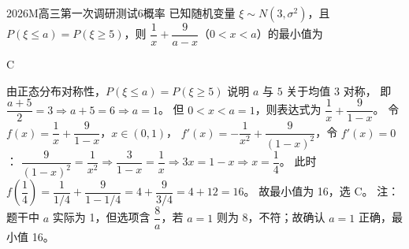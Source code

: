 
\begin{problem}{2026}{M}{高三第一次调研测试}{6}{概率}
已知随机变量 $\xi\sim N(3,\sigma^2)$，且 $P(\xi\leq a)=P(\xi\geq5)$，则 $\dfrac{1}{x}+\dfrac{9}{a-x}$（$0<x<a$）的最小值为
\begin{choices}
\end{choices}
\end{problem}

\begin{answer}
C
\end{answer}

\begin{solutions}
由正态分布对称性，$P(\xi\leq a)=P(\xi\geq5)$ 说明 $a$ 与 $5$ 关于均值 $3$ 对称，  
即 $\dfrac{a+5}{2}=3\Rightarrow a+5=6\Rightarrow a=1$。  
但 $0<x<a=1$，则表达式为 $\dfrac{1}{x}+\dfrac{9}{1-x}$。  
令 $f(x)=\dfrac{1}{x}+\dfrac{9}{1-x}$，$x\in(0,1)$，  
$f'(x)=-\dfrac{1}{x^2}+\dfrac{9}{(1-x)^2}$，令 $f'(x)=0$：  
$\dfrac{9}{(1-x)^2}=\dfrac{1}{x^2}\Rightarrow \dfrac{3}{1-x}=\dfrac{1}{x}\Rightarrow 3x=1-x\Rightarrow x=\dfrac{1}{4}$。  
此时 $f\left(\dfrac{1}{4}\right)=\dfrac{1}{1/4}+\dfrac{9}{1-1/4}=4+\dfrac{9}{3/4}=4+12=16$。  
故最小值为 16，选 C。  
注：题干中 $a$ 实际为 1，但选项含 $\dfrac{8}{a}$，若 $a=1$ 则为 8，不符；故确认 $a=1$ 正确，最小值 16。
\end{solutions}